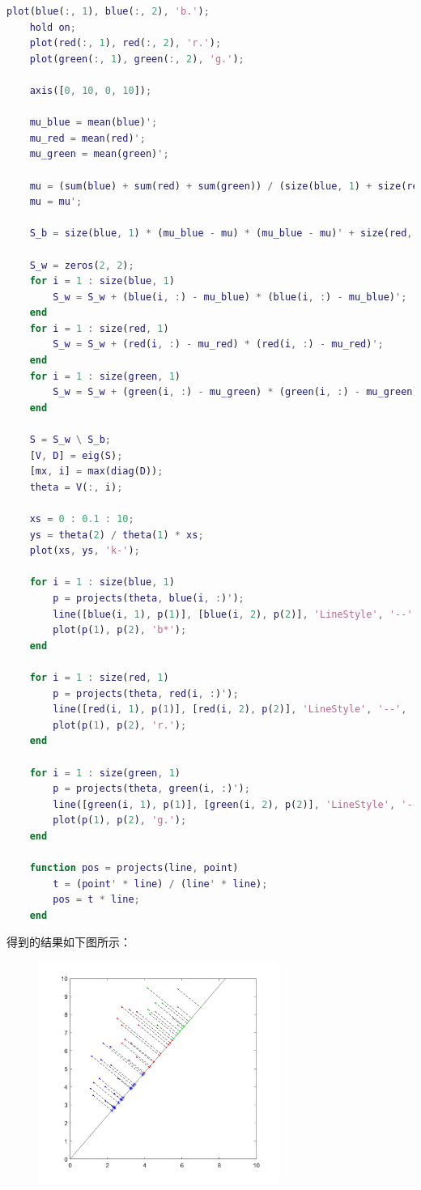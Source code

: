\documentclass{article}
\begin{document}
\begin{lstlisting}[language=matlab]
    plot(blue(:, 1), blue(:, 2), 'b.');
    hold on;
    plot(red(:, 1), red(:, 2), 'r.');
    plot(green(:, 1), green(:, 2), 'g.');

    axis([0, 10, 0, 10]);

    mu_blue = mean(blue)';
    mu_red = mean(red)';
    mu_green = mean(green)';

    mu = (sum(blue) + sum(red) + sum(green)) / (size(blue, 1) + size(red, 1) + size(green, 1));
    mu = mu';

    S_b = size(blue, 1) * (mu_blue - mu) * (mu_blue - mu)' + size(red, 1) * (mu_red - mu) * (mu_red - mu)' + size(green, 1) * (mu_green - mu) * (mu_green - mu)';

    S_w = zeros(2, 2);
    for i = 1 : size(blue, 1)
        S_w = S_w + (blue(i, :) - mu_blue) * (blue(i, :) - mu_blue)';
    end
    for i = 1 : size(red, 1)
        S_w = S_w + (red(i, :) - mu_red) * (red(i, :) - mu_red)';
    end
    for i = 1 : size(green, 1)
        S_w = S_w + (green(i, :) - mu_green) * (green(i, :) - mu_green)';
    end

    S = S_w \ S_b;
    [V, D] = eig(S);
    [mx, i] = max(diag(D));
    theta = V(:, i);

    xs = 0 : 0.1 : 10;
    ys = theta(2) / theta(1) * xs;
    plot(xs, ys, 'k-');

    for i = 1 : size(blue, 1)
        p = projects(theta, blue(i, :)');
        line([blue(i, 1), p(1)], [blue(i, 2), p(2)], 'LineStyle', '--', 'Color', 'k', 'LineWidth', 0.5);
        plot(p(1), p(2), 'b*');
    end

    for i = 1 : size(red, 1)
        p = projects(theta, red(i, :)');
        line([red(i, 1), p(1)], [red(i, 2), p(2)], 'LineStyle', '--', 'Color', 'k', 'LineWidth', 0.5);
        plot(p(1), p(2), 'r.');
    end

    for i = 1 : size(green, 1)
        p = projects(theta, green(i, :)');
        line([green(i, 1), p(1)], [green(i, 2), p(2)], 'LineStyle', '--', 'Color', 'k', 'LineWidth', 0.5);
        plot(p(1), p(2), 'g.');
    end

    function pos = projects(line, point)
        t = (point' * line) / (line' * line);
        pos = t * line;
    end
\end{lstlisting}

得到的结果如下图所示：
\begin{figure}[H]
    \centering
    \includegraphics[width=0.7\textwidth]{2.png}
\end{figure}
\end{document}
